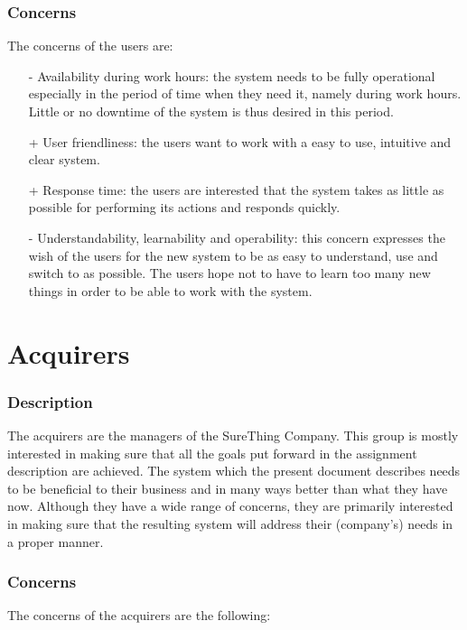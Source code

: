 \subsubsection{Concerns}
The concerns of the users are:
\begin{itemize}
\item[-] Availability during work hours: the system needs to be
fully operational especially in the period of time when they need it,
namely during work hours. Little or no downtime of the system is thus
desired in this period.
\item[+] User friendliness: the users want to work with a easy to use,
intuitive and clear system.
\item[+] Response time: the users are interested that the system
takes as little as possible for performing its actions and responds
quickly.
\item[-] Understandability, learnability and operability: this concern
expresses the wish of the users for the new system to be as easy to
understand, use and switch to as possible. The users hope not to have
to learn too many new things in order to be able to work with the system.
\end{itemize}

\section{Acquirers}

\subsubsection{Description}
The acquirers are the managers of the SureThing Company. This
group is mostly interested in making sure that all the goals put forward
in the assignment description are achieved. The system which the present
document describes needs to be beneficial to their business and in many
ways better than what they have now. Although they have a wide range
of concerns, they are primarily interested in making sure that the
resulting system will address their (company's) needs in a proper manner.

\subsubsection{Concerns}
The concerns of the acquirers are the following:

